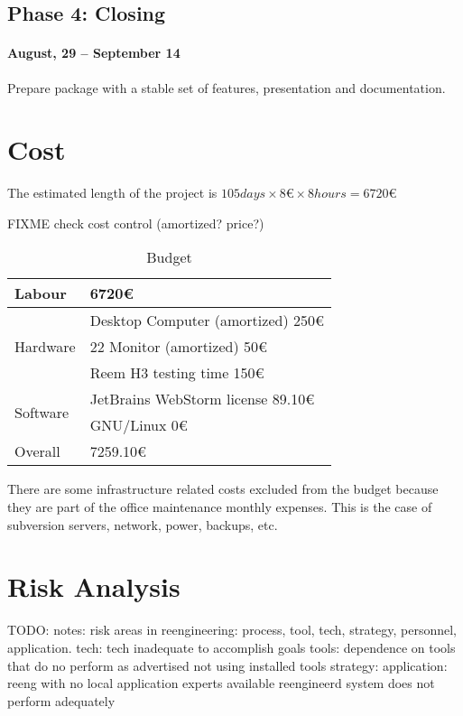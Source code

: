 \subsection{Phase 4: Closing}
\paragraph{August, 29 -- September 14}
Prepare package with a stable set of features, presentation and documentation.

\section{Cost}
\label{sec:budget}
The estimated length of the project is $105 days \times 8 \euro{} \times 8 hours = 6720 \euro{} $

FIXME check cost control (amortized? price?)

\begin{table}[ht]
    \centering
    \caption{Budget}
    \label{tab:budget}
    \begin{tabular}{| l | l |}
    \hline
    Labour & 6720\euro{} \\ \hline
    \multirow{3}{*}{Hardware} 
        & Desktop Computer (amortized) 250\euro{} \\ %
        & 22 Monitor (amortized) 50\euro{} \\
        & Reem H3 testing time 150\euro{} \\ \hline   
    \multirow{2}{*}{Software}
        & JetBrains WebStorm license 89.10\euro{} \\ %
        & GNU/Linux 0\euro{} \\ \hline
     Overall & 7259.10\euro{} \\ 
     \hline
    \end{tabular}
\end{table}

There are some infrastructure related costs excluded from the budget because they are part of the office maintenance monthly expenses.
This is the case of subversion servers, network, power, backups, etc. 

\section{Risk Analysis}
TODO: notes: risk areas in reengineering: process, tool,  tech, strategy, personnel, application.
tech:  tech inadequate to accomplish goals
tools: dependence on tools that do no perform as advertised
not using installed tools
strategy: 
application: reeng with no local application experts available 
reengineerd system does not perform adequately

